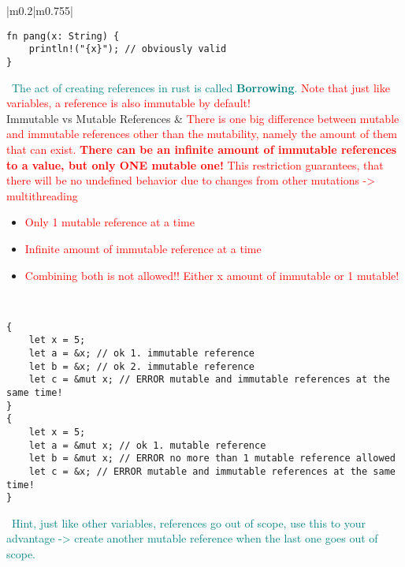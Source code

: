 \documentclass[main.tex,fontsize=8pt,paper=a4,paper=portrait,DIV=calc,]{scrartcl}
\begin{document}
\begin{table}[ht!]
\begin{tabular}{|m{0.2\linewidth}|m{0.755\linewidth}|}
\begin{lstlisting}
fn pang(x: String) {
    println!("{x}"); // obviously valid
}
\end{lstlisting}
\, \newline
\textcolor{teal}{The act of creating references in rust is called \textbf{Borrowing}.}\newline
\textcolor{red}{Note that just like variables, a reference is also immutable by default!}\\
\hline
Immutable vs Mutable References & 
\textcolor{red}{There is one big difference between mutable and immutable references other than the mutability, namely the amount of them that can exist.\newline
\textbf{There can be an infinite amount of immutable references to a value, but only ONE mutable one!}\newline
This restriction guarantees, that there will be no undefined behavior due to changes from other mutations -> multithreading}
\, \newline
\, \newline
\begin{itemize}
\item \large \textcolor{red}{Only 1 mutable reference at a time}
\item \large \textcolor{red}{Infinite amount of immutable reference at a time}
\item \large \textcolor{red}{Combining both is not allowed!! Either x amount of immutable or 1 mutable!}
\end{itemize}
\normalsize \, \newline
\begin{lstlisting}
{
    let x = 5;
    let a = &x; // ok 1. immutable reference
    let b = &x; // ok 2. immutable reference
    let c = &mut x; // ERROR mutable and immutable references at the same time!
}
{
    let x = 5;
    let a = &mut x; // ok 1. mutable reference
    let b = &mut x; // ERROR no more than 1 mutable reference allowed
    let c = &x; // ERROR mutable and immutable references at the same time!
}
\end{lstlisting}
\, \newline
\textcolor{teal}{Hint, just like other variables, references go out of scope, use this to your advantage -> create another mutable reference when the last one goes out of scope.}\\
\hline
\end{tabular}
\end{table}
\pagebreak
\end{document}
